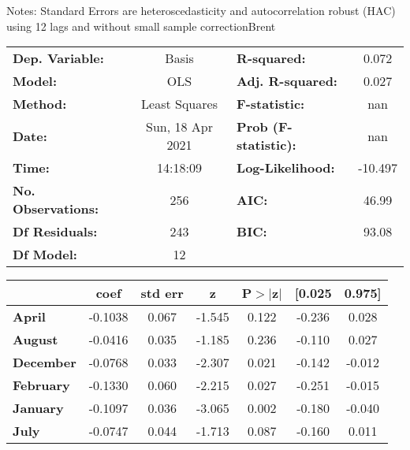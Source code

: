 Notes: \newline
 [1] Standard Errors are heteroscedasticity and autocorrelation robust (HAC) using 12 lags and without small sample correctionBrent\begin{center}
\begin{tabular}{lclc}
\toprule
\textbf{Dep. Variable:}    &      Basis       & \textbf{  R-squared:         } &     0.072   \\
\textbf{Model:}            &       OLS        & \textbf{  Adj. R-squared:    } &     0.027   \\
\textbf{Method:}           &  Least Squares   & \textbf{  F-statistic:       } &       nan   \\
\textbf{Date:}             & Sun, 18 Apr 2021 & \textbf{  Prob (F-statistic):} &      nan    \\
\textbf{Time:}             &     14:18:09     & \textbf{  Log-Likelihood:    } &   -10.497   \\
\textbf{No. Observations:} &         256      & \textbf{  AIC:               } &     46.99   \\
\textbf{Df Residuals:}     &         243      & \textbf{  BIC:               } &     93.08   \\
\textbf{Df Model:}         &          12      & \textbf{                     } &             \\
\bottomrule
\end{tabular}
\begin{tabular}{lcccccc}
                   & \textbf{coef} & \textbf{std err} & \textbf{z} & \textbf{P$> |$z$|$} & \textbf{[0.025} & \textbf{0.975]}  \\
\midrule
\textbf{April}     &      -0.1038  &        0.067     &    -1.545  &         0.122        &       -0.236    &        0.028     \\
\textbf{August}    &      -0.0416  &        0.035     &    -1.185  &         0.236        &       -0.110    &        0.027     \\
\textbf{December}  &      -0.0768  &        0.033     &    -2.307  &         0.021        &       -0.142    &       -0.012     \\
\textbf{February}  &      -0.1330  &        0.060     &    -2.215  &         0.027        &       -0.251    &       -0.015     \\
\textbf{January}   &      -0.1097  &        0.036     &    -3.065  &         0.002        &       -0.180    &       -0.040     \\
\textbf{July}      &      -0.0747  &        0.044     &    -1.713  &         0.087        &       -0.160    &        0.011     \\

\end{tabular}
\end{center}
